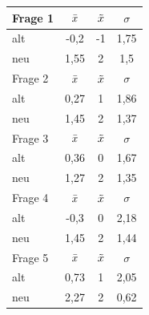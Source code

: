 \begin{table}[H]
\justifying
\begin{tabular}{|l|c|c|c|}
\hline
Frage 1   & $\Bar{x}$ & $\Tilde{x}$ & $\sigma$ \\ \hline
alt       & -0,2      & -1          & 1,75     \\ \hline
neu       & 1,55      & 2           & 1,5      \\ \hline
\hline
Frage 2   & $\Bar{x}$ & $\Tilde{x}$ & $\sigma$ \\ \hline
alt       & 0,27      &  1          &  1,86    \\ \hline
neu       & 1,45      &  2          &  1,37    \\ \hline
\hline
Frage 3   & $\Bar{x}$ & $\Tilde{x}$ & $\sigma$ \\ \hline
alt       & 0,36      &  0          &  1,67    \\ \hline
neu       & 1,27      &  2          &  1,35    \\ \hline
\hline
Frage 4   & $\Bar{x}$ & $\Tilde{x}$ & $\sigma$ \\ \hline
alt       & -0,3      &  0         &  2,18    \\ \hline
neu       & 1,45      &  2         &  1,44    \\ \hline
\hline
Frage 5   & $\Bar{x}$ & $\Tilde{x}$ & $\sigma$ \\ \hline
alt       & 0,73      &  1          &  2,05    \\ \hline
neu       & 2,27      &  2          &  0,62    \\ \hline

\end{tabular}
\end{table}
